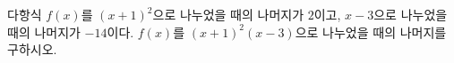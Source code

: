다항식 $f(x)$를 $(x+1)^2$으로 나누었을 때의 나머지가 $2$이고, $x-3$으로 나누었을 때의 나머지가 $-14$이다. $f(x)$를 $(x+1)^2(x-3)$으로 나누었을 때의 나머지를 구하시오.
